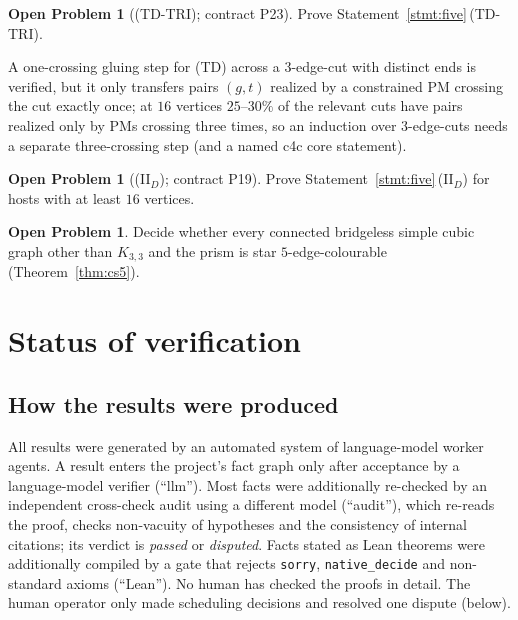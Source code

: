 \documentclass[11pt]{amsart}
\theoremstyle{definition}
\newtheorem{problem}[theorem]{Open Problem}
\theoremstyle{remark}
\newcommand{\hyp}[1]{\textup{(#1)}}
\newcommand{\Lean}{\textsf{Lean}}
\begin{document}
\begin{problem}[\hyp{TD-TRI}; contract P23]\label{prob:p23}
Prove Statement~\ref{stmt:five}\,\hyp{TD-TRI}.
\end{problem}
A one-crossing gluing step for \hyp{TD} across a $3$-edge-cut with distinct ends is verified, but it only transfers pairs $(g,t)$ realized by a constrained PM crossing the cut exactly once; at $16$ vertices $25$--$30\%$ of the relevant cuts have pairs realized only by PMs crossing three times, so an induction over $3$-edge-cuts needs a separate three-crossing step (and a named c4c core statement).

\begin{problem}[\hyp{II$_D$}; contract P19]\label{prob:p19}
Prove Statement~\ref{stmt:five}\,\hyp{II$_D$} for hosts with at least $16$ vertices.
\end{problem}

\begin{problem}
Decide whether every connected bridgeless simple cubic graph other than $K_{3,3}$ and the prism is star $5$-edge-colourable (Theorem~\ref{thm:cs5}).
\end{problem}

\section{Status of verification}\label{sec:status}

\subsection{How the results were produced}
All results were generated by an automated system of language-model worker agents. A result enters the project's fact graph only after acceptance by a language-model verifier (``llm''). Most facts were additionally re-checked by an independent cross-check audit using a different model (``audit''), which re-reads the proof, checks non-vacuity of hypotheses and the consistency of internal citations; its verdict is \emph{passed} or \emph{disputed}. Facts stated as \Lean{} theorems were additionally compiled by a gate that rejects \texttt{sorry}, \texttt{native\_decide} and non-standard axioms (``Lean''). No human has checked the proofs in detail. The human operator only made scheduling decisions and resolved one dispute (below).
\end{document}
